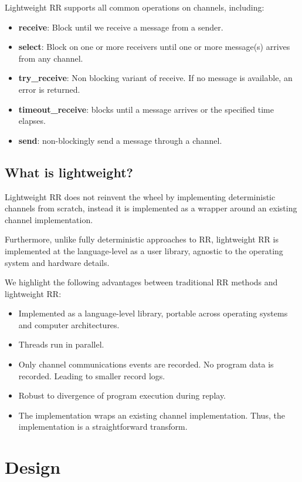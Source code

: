 \documentclass{article}
\begin{document}
Lightweight RR supports all common operations on channels, including:
\begin{itemize}
\item  \textbf{receive}: Block until we receive a message from a sender.
\item  \textbf{select}: Block on one or more receivers until one or more message(s) arrives from any channel.
\item  \textbf{try\_receive}: Non blocking variant of receive. If no message is available, an
  error is returned.
\item  \textbf{timeout\_receive}: blocks until a message arrives or the specified time elapses.
\item  \textbf{send}: non-blockingly send a message through a channel.
\end{itemize}

\subsection{What is lightweight?}
Lightweight RR does not reinvent the wheel by implementing deterministic channels from
scratch, instead it is implemented as a wrapper around an existing channel
implementation.

Furthermore, unlike fully deterministic approaches to RR, lightweight RR is
implemented at the language-level as a user library, agnostic to the operating system and
hardware details.

We highlight the following advantages between traditional RR methods and lightweight RR:
\begin{itemize}
\item Implemented as a language-level library, portable across operating systems and
  computer architectures.
\item Threads run in parallel.
\item Only channel communications events are recorded. No program data is recorded.
  Leading to smaller record logs.
\item Robust to divergence of program execution during replay.
\item The implementation wraps an existing channel implementation. Thus, the
  implementation is a straightforward transform.
\end{itemize}

\section{Design}
\end{document}
